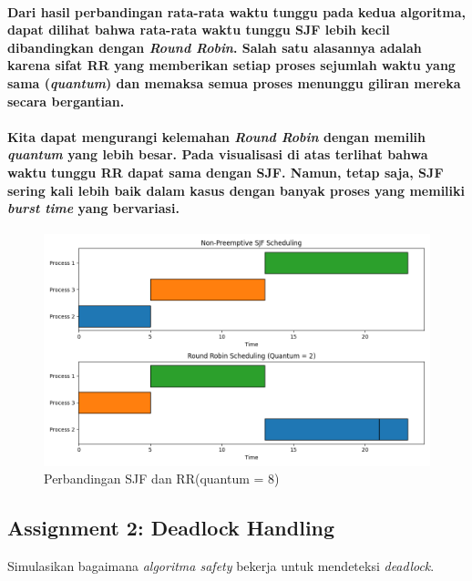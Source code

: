 \documentclass[12pt]{article}
\begin{document}
\paragraph{
    \hspace*{1cm} Dari hasil perbandingan rata-rata waktu tunggu pada kedua algoritma, dapat dilihat bahwa rata-rata waktu tunggu SJF lebih kecil dibandingkan dengan \textit{Round Robin}. Salah satu alasannya adalah karena sifat RR yang memberikan setiap proses sejumlah waktu yang sama (\textit{quantum}) dan memaksa semua proses menunggu giliran mereka secara bergantian. 
}

\paragraph{
    \hspace*{1cm} Kita dapat mengurangi kelemahan \textit{Round Robin} dengan memilih \textit{quantum} yang lebih besar. Pada visualisasi di atas terlihat bahwa waktu tunggu RR dapat sama dengan SJF. Namun, tetap saja, SJF sering kali lebih baik dalam kasus dengan banyak proses yang memiliki \textit{burst time} yang bervariasi.
}

\begin{figure}[H]
    \centering
    \includegraphics[width=1\linewidth]{asset/412.png}
    \caption{Perbandingan SJF dan RR(quantum = 8)}
\end{figure}


\subsection{Assignment 2: Deadlock Handling}
\hspace*{1cm} Simulasikan bagaimana \textit{algoritma safety} bekerja untuk mendeteksi \textit{deadlock}.
\newline
\newline
\end{document}
